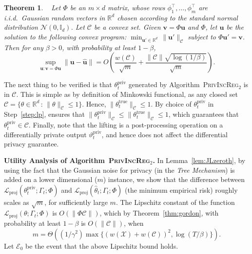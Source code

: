 \documentclass{article}
\theoremstyle{plain}
\newtheorem{theorem}{Theorem}[section]
\def \ProjPrivIncReg {\textsc{PrivIncReg$_2$}\xspace}
\def \CCC {\mathcal{C}}
\def \EEE {\mathcal{E}}
\def \XXX {\mathcal{X}}
\def \NNN {\mathcal{N}}
\def \LLL {\mathcal{L}}
\def \u {\mathbf u}
\def \true {{\mathrm{true}}}
\def \priv {{\mathrm{priv}}}
\def \proj {{\mathrm{proj}}}
\def \v {\mathbf v}
\def \x {\mathbf x}
\def \R {\mathbb{R}}
\begin{document}
\begin{theorem}~\cite{vershynin2014estimation} \label{thm:exist}
Let $\Phi$ be an $m \times d$ matrix, whose rows $\phi_1^\top,\dots,\phi_m^\top$ are i.i.d.\ Gaussian random vectors in $\R^d$ chosen according to the standard normal distribution $\NNN(0,\mathbb{I}_d)$. Let $\CCC$ be a convex set. Given $\v = \Phi \u$ and $\Phi$, let $\hat{\u}$ be the solution to the following convex program: $\min_{\u'\in \R^d}\, \| \u' \|_{\CCC}$ subject to $\Phi \u' = \v$. Then for any $\beta > 0$, with probability at least $1-\beta$, 
$$\sup_{\u: \v = \Phi \u} \| \u - \hat{\u} \| = O\left ( \frac{w(\CCC)}{\sqrt{m}} + \frac{\| \CCC \| \sqrt{\log(1/\beta)}}{\sqrt{m}} \right).$$ 
\end{theorem}

The next thing to be verified is that $\theta^\priv_t$ generated by Algorithm~\ProjPrivIncReg is in $\CCC$. This is simple as by definition of Minkowski functional, as any closed set $\CCC = \{ \theta \in \R^d \,: \, \| \theta \|_{\CCC} \leq 1\}$. Hence, $\|\theta^\true_t\|_{\CCC} \leq 1$. By choice of $\theta^\priv_t$ in Step~\ref{step:lp}, ensures that $\| \theta^\priv_t\|_{\CCC} \leq \|\theta^\true_t\|_{\CCC} \leq 1$, which guarantees that $\theta^\priv_t \in \CCC$. Finally, note that the lifting is a post-processing operation on a differentially private output $\vartheta^\priv_t$, and hence does not affect the differential privacy guarantee.


\smallskip
\noindent\textbf{Utility Analysis of Algorithm~\ProjPrivIncReg.} In Lemma~\ref{lem:JLzeroth}, by using the fact that the Gaussian noise for privacy (in the \emph{Tree Mechanism}) is added on a lower dimensional ($m$) instance, we show that the difference between $\LLL_\proj(\theta^\priv_t;\Gamma_t;\Phi)$ and $\LLL_\proj(\hat{\theta}_t;\Gamma_t;\Phi)$ (the minimum empirical risk) roughly scales as $\sqrt{m}$, for sufficiently large $m$. The Lipschitz constant of the function $\LLL_\proj(\theta;\Gamma_t;\Phi)$ is $O(\| \Phi \CCC\|)$, which by Theorem~\ref{thm:gordon}, with probability at least $1-\beta$ is $O(\| \CCC \|)$, when 
$$m = \Theta((1/\gamma^2)\max\{(w(\XXX)+w(\CCC))^2,\log(T/\beta)\}).$$ Let $\EEE_0$ be the event that the above Lipschitz bound holds. 
\end{document}
